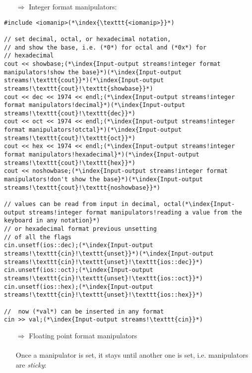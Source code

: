 \documentclass[10pt]{book}
\begin{document}
\begin{enumerate}
\item[$\Rightarrow$] Integer format manipulators:
\end{enumerate}
\begin{lstlisting}
#include <iomanip>(*\index{\texttt{<iomanip>}}*)

// set decimal, octal, or hexadecimal notation,
// and show the base, i.e. (*0*) for octal and (*0x*) for
// hexadecimal
cout << showbase;(*\index{Input-output streams!integer format manipulators!show the base}*)(*\index{Input-output streams!\texttt{cout}}*)(*\index{Input-output streams!\texttt{cout}!\texttt{showbase}}*)
cout << dec << 1974 << endl;(*\index{Input-output streams!integer format manipulators!decimal}*)(*\index{Input-output streams!\texttt{cout}!\texttt{dec}}*)
cout << oct << 1974 << endl;(*\index{Input-output streams!integer format manipulators!otctal}*)(*\index{Input-output streams!\texttt{cout}!\texttt{oct}}*)
cout << hex << 1974 << endl;(*\index{Input-output streams!integer format manipulators!hexadecimal}*)(*\index{Input-output streams!\texttt{cout}!\texttt{hex}}*)
cout << noshowbase;(*\index{Input-output streams!integer format manipulators!don't show the base}*)(*\index{Input-output streams!\texttt{cout}!\texttt{noshowbase}}*)

// values can be read from input in decimal, octal(*\index{Input-output streams!integer format manipulators!reading a value from the keyboard in any notation}*)
// or hexadecimal format previous unsetting
// of all the flags
cin.unsetf(ios::dec);(*\index{Input-output streams!\texttt{cin}!\texttt{unset}}*)(*\index{Input-output streams!\texttt{cin}!\texttt{unset}!\texttt{ios::dec}}*)
cin.unsetf(ios::oct);(*\index{Input-output streams!\texttt{cin}!\texttt{unset}!\texttt{ios::oct}}*)
cin.unsetf(ios::hex);(*\index{Input-output streams!\texttt{cin}!\texttt{unset}!\texttt{ios::hex}}*)

//  now (*val*) can be inserted in any format
cin >> val;(*\index{Input-output streams!\texttt{cin}}*)
\end{lstlisting}
\begin{enumerate}
\item[$\Rightarrow$] Floating point format manipulators\\ \\ Once a  manipulator is set, it stays until another one is set, i.e. manipulators are \emph{sticky}:
\end{enumerate}
\end{document}
